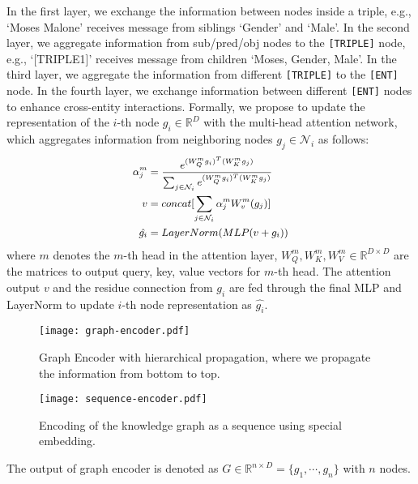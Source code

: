\documentclass[11pt,a4paper]{article}
\begin{document}
In the first layer, we exchange the information between nodes inside a triple, e.g., `Moses Malone' receives message from siblings `Gender' and `Male'. In the second layer, we aggregate information from sub/pred/obj nodes to the \texttt{[TRIPLE]} node, e.g., `[TRIPLE1]' receives message from children `Moses, Gender, Male'. In the third layer, we aggregate the information from different \texttt{[TRIPLE]} to the \texttt{[ENT]} node. In the fourth layer, we exchange information between different \texttt{[ENT]} nodes to enhance cross-entity interactions. Formally, we propose to update the representation of the $i$-th node $g_i \in \mathbb{R}^D$ with the multi-head attention network, which aggregates information from neighboring nodes $g_j \in \mathcal{N}_i$ as follows:
\begin{align}
\small
\begin{split}
    \alpha^m_j &= \frac{e^{(W_Q^m g_i)^T (W_K^m g_j)}}{\sum_{j \in \mathcal{N}_i} e^{(W_Q^m g_i)^T  (W_K^m g_j)}} \\
    v &= concat[\sum_{j \in \mathcal{N}_i} \alpha^m_j W_v^m(g_j)] \\
    \hat{g_i} &= LayerNorm(MLP(v + g_i))
\end{split}
\end{align}
where $m$ denotes the $m$-th head in the attention layer, $W^m_Q, W^m_K, W^m_V \in \mathbb{R}^{D \times D}$ are the matrices to output query, key, value vectors for $m$-th head. The attention output $v$ and the residue connection from $g_i$ are fed through the final MLP and LayerNorm to update $i$-th node representation as $\hat{g_i}$. 
\begin{figure*}[!thb]
    \centering
    \texttt{[image: graph-encoder.pdf]}
    \caption{Graph Encoder with hierarchical propagation, where we propagate the information from bottom to top. }
    \label{fig:graph-encoder}
    \vspace{2ex}
    \texttt{[image: sequence-encoder.pdf]}
    \caption{Encoding of the knowledge graph as a sequence using special embedding. }
    \label{fig:sequence-encoder}
\end{figure*}
The output of graph encoder is denoted as $G \in \mathbb{R}^{n \times D}=\{g_1, \cdots, g_n\}$ with $n$ nodes.
\end{document}
